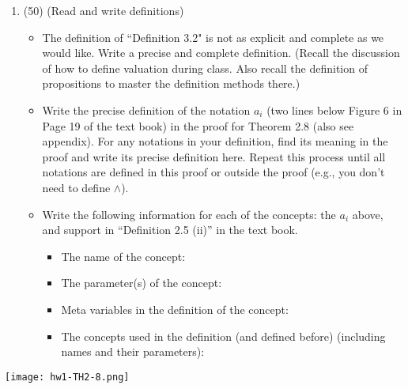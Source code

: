 \documentclass[12pt, letterpaper]{article}
\begin{document}
\begin{enumerate}
\item (50)  (Read and write definitions)
\begin{itemize} 
\item The definition of ``Definition 3.2" is not as explicit and complete as we would like. Write a precise and complete  definition. (Recall the discussion of how to define valuation during class. Also recall the definition of propositions to master the definition methods there.)
\item  Write  the precise definition of the notation $a_i$ (two lines below Figure 6 in Page 19 of the text book) 
in the proof for Theorem 2.8 (also see appendix). 
For any notations in your definition, 
find its meaning in the proof and write its precise definition here. Repeat this process until all notations are defined in this proof or outside the proof (e.g., you don't need to define $\land$). 
\item Write the following information for each of the concepts: the $a_i$ above, and support in ``Definition 2.5 (ii)'' in the text book.
\begin{itemize}
  \item The name of the concept: 
  \item The parameter(s) of the concept: 
  \item Meta variables in the definition of the concept:
  \item The concepts used in the definition (and defined before) (including names and their parameters): 
\end{itemize} 
\end{itemize}
\end{enumerate}

\vspace{0.5cm}
\newpage
{}

\begin{center}
	\texttt{[image: hw1-TH2-8.png]}
\end{center}
\end{document}

